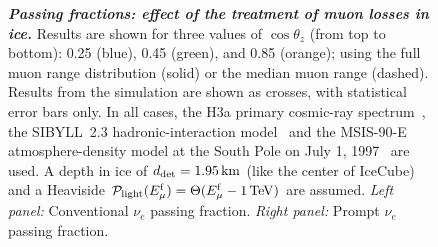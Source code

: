 \begin{figure}
	\centering
	\caption{\textbf{\textit{Passing fractions: effect of the treatment of muon losses in ice.}} Results are shown for three values of $\cos\theta_z$ (from top to bottom): 0.25 (blue), 0.45 (green), and 0.85 (orange); using the full muon range distribution (solid) or the median muon range (dashed). Results from the \CORSIKA{} simulation are shown as crosses, with statistical error bars only. In all cases, the H3a primary cosmic-ray spectrum~\cite{Gaisser:2011cc}, the SIBYLL~2.3 hadronic-interaction model~\cite{Engel:2015dxa, Riehn:2015oba} and the MSIS-90-E atmosphere-density model at the South Pole on July 1, 1997~\cite{Labitzke:1985, Hedin:1991} are used. A depth in ice of $d_{\rm det} = \SI{1.95}\km$ (like the center of IceCube) and a Heaviside ${\cal P}_{\rm light}(E_{\mu}^{\rm f}) = \Theta(E_{\mu}^{\rm f} - 1\,{\rm TeV})$ are assumed. \textit{Left panel:} Conventional $\nu_e$ passing fraction. \textit{Right panel:} Prompt $\nu_e$ passing fraction.
	}
	\label{fig:nue_passing-preach-effect}
\end{figure}

